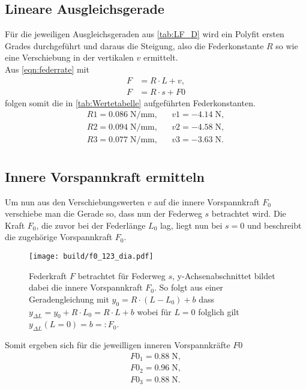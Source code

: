 \subsection{Lineare Ausgleichsgerade}
\label{sec:fit}
Für die jeweiligen Ausgleichsgeraden aus \ref{tab:LF_D} wird ein Polyfit \cite{numpy_polyfit}
ersten Grades durchgeführt und daraus die Steigung, also die Federkonstante $R$ so wie eine Verschiebung
in der vertikalen $v$ ermittelt.\\
Aus \ref{eqn:federrate} mit
\begin{align*}
  F&=R \cdot L + v ,\\
  F&=R \cdot s + F0
\end{align*}
folgen somit die in \ref{tab:Wertetabelle} aufgeführten Federkonstanten.
\begin{align*}
  R1= 0.086\;\si{\N\per\mm}, &&  v1= -4.14\;\si{\N},\\
  R2= 0.094\;\si{\N\per\mm}, &&  v2= -4.58\;\si{\N},\\
  R3= 0.077\;\si{\N\per\mm}, &&  v3= -3.63\;\si{\N}.\\
\end{align*}

\subsection{Innere Vorspannkraft ermitteln}
\label{sec:vorspannkraft}
Um nun aus den Verschiebungswerten $v$ auf die innere Vorspannkraft $F_0$ verschiebe
man die Gerade so, dass nun der Federweg $s$ betrachtet wird.
Die Kraft $F_0$, die zuvor bei der Federlänge $L_0$ lag, liegt nun bei $s=0$
und beschreibt die zugehörige Vorspannkraft $F_0$.
\begin{figure}[H]
  \center
  \texttt{[image: build/f0\_123\_dia.pdf]}
  \caption
  {
    Federkraft $F$ betrachtet für Federweg $s$, y-Achsenabschnittet bildet dabei die innere Vorspannkraft $F_0$.
    So folgt aus einer Geradengleichung mit $y_0=R\cdot(L-L_0)+b$ dass $y_{\Delta L}=y_0+R \cdot L_0=R \cdot L+b$
    wobei für $L=0$ folglich gilt $y_{\Delta L}(L=0)=b=:F_0$.
  }
\end{figure}
Somit ergeben sich für die jeweilligen inneren Vorspannkräfte $F0$
\begin{align*}
  F0_1=  0.88 \;\si{\N},\\
  F0_2=  0.96 \;\si{\N},\\
  F0_3=  0.88 \;\si{\N}.\\
\end{align*}



